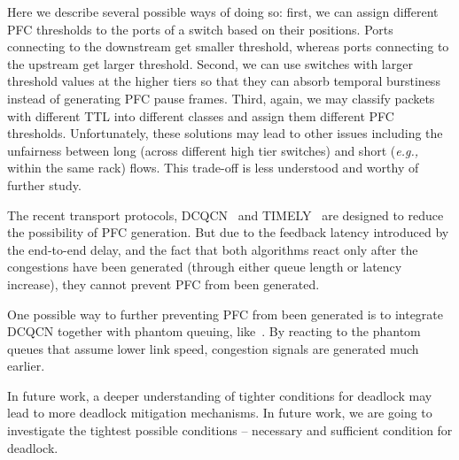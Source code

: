 Here we describe several possible ways of doing so: first, we can assign different PFC thresholds to 
the ports of a switch based on their positions. Ports connecting to the downstream get smaller threshold, 
whereas ports connecting to the upstream get larger threshold. 
Second, we can use switches with larger threshold values at the higher tiers so that they can absorb 
temporal burstiness instead of generating PFC pause frames. Third, again, we may classify 
packets with different TTL into different classes and assign them different PFC thresholds.
Unfortunately, these solutions may lead to other issues including the unfairness between long (across 
different high tier switches) and short ({\em e.g.,} within the same rack) flows. 
This trade-off is less understood and worthy of further study.




The recent transport protocols, DCQCN~\cite{dcqcn} and TIMELY~\cite{timely} are designed to reduce 
the possibility of PFC generation. But due to the feedback 
latency introduced by the end-to-end delay, and the fact that both algorithms react only after the 
congestions have been generated (through either queue length or latency increase), they cannot prevent PFC 
from been generated. 

One possible way to further preventing PFC from been generated is to integrate DCQCN together with 
phantom queuing, like~\cite{Alizadeh12}. By reacting to the phantom queues that assume lower link speed, 
congestion signals are generated much earlier. 

 In future work, a deeper understanding of tighter conditions 
for deadlock may lead to more deadlock mitigation mechanisms. In future work, we are going to 
investigate the tightest possible conditions -- necessary and sufficient condition for deadlock. 